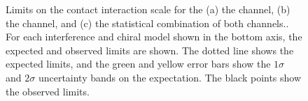 {\begin{figure}[h!]
\vspace{1em}
\caption{Limits on the contact interaction scale \lam for the (a) the \ee channel, (b) the \mm channel, and (c) the statistical combination of both channels..
For each interference and chiral model shown in the bottom axis, the expected and observed limits are shown. The dotted line shows the expected limits, and the green and yellow error bars show the $1\sigma$ and $2\sigma$ uncertainty bands on the expectation. The black points show the observed limits.}
\label{fig:limLamb}
\end{figure}
\clearpage
}


